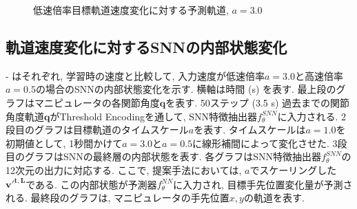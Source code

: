 \begin{figure}[htb]
    \centering
    \begin{minipage}{1.0\textwidth}
        \centering
        
        \label{fig:result3:3:a3.0:snn}
    \end{minipage}

    \begin{minipage}{1.0\textwidth}
        \centering
        
        \label{fig:result3:3:a3.0:dyna}
    \end{minipage}

    \caption{低速倍率目標軌道速度変化に対する予測軌道, $a=3.0$}
    \label{fig:result3:3:a3.0}
\end{figure}



\subsection{軌道速度変化に対するSNNの内部状態変化}
 - はそれぞれ, 学習時の速度と比較して, 入力速度が低速倍率$a=3.0$と高速倍率$a=0.5$の場合のSNNの内部状態変化を示す.
横軸は時間 (s) を表す.
最上段のグラフはマニピュレータの各関節角度$\bm{q}$を表す.
50ステップ (3.5 s) 過去までの関節角度軌道$\bm{q}$がThreshold Encodingを通して, SNN特徴抽出器$f^{SNN}_\theta$に入力される.
2段目のグラフは目標軌道のタイムスケール$a$を表す.
タイムスケールは$a=1.0$を初期値として, 1秒間かけて$a=3.0$と$a=0.5$に線形補間によって変化させた.
3段目のグラフはSNNの最終層の内部状態を表す.
各グラフはSNN特徴抽出器$f^{SNN}_\theta$の12次元の出力に対応する.
ここで, 提案手法においては, $a$でスケーリングした$\bm{{v'}^{t,L}}$である.
この内部状態が予測器$f^{NN}_\theta$に入力され, 目標手先位置変化量が予測される.
最終段のグラフは, マニピュレータの手先位置$x,y$の軌道を表す.

